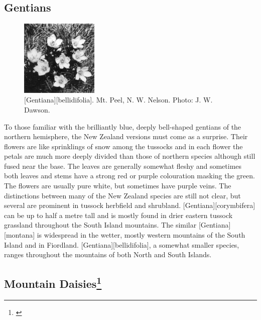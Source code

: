 \subsection{Gentians}

\begin{figure}
	\includegraphics[width=0.33\textwidth]{graphics/figure101gentiana.jpg}
	\centering
	\caption[\emph{Gentiana bellidifolia}]{[Gentiana][bellidifolia].
	Mt. Peel,  N. W. Nelson.
	Photo: J. W. Dawson.}%
	\label{fig:101gentiana}
\end{figure}

To those familiar with the brilliantly blue, deeply bell-shaped gentians of the northern hemisphere, the New Zealand versions must come as a surprise.
Their flowers are like sprinklings of snow among the tussocks and in each flower the petals are much more deeply divided than those of northern species although still fused near the base.
The leaves are generally somewhat fleshy and sometimes both leaves and stems have a strong red or purple colouration masking the green.
The flowers are usually pure white, but sometimes have purple veins.
The distinctions between many of the New Zealand species are still not clear, but several are prominent in tussock herbfield and shrubland. [Gentiana][corymbifera] can be up to half a metre tall and is mostly found in drier eastern tussock grassland throughout the South Island mountains.
The similar [Gentiana][montana] is widespread in the wetter, mostly western mountains of the South Island and in Fiordland. [Gentiana][bellidifolia], a somewhat smaller species, ranges throughout the mountains of both North and South Islands.

\subsection[Mountain Daisies]{Mountain Daisies\thinspace\footnote{\cite{given1969synopsis}}}

